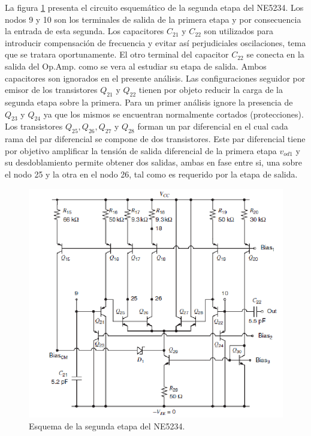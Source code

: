 \documentclass[12pt,a4paper,final,headinclude,footinclude,BCOR5mm]{scrartcl}
\begin{document}
La figura \ref{637} presenta el circuito esquemático de la segunda etapa del NE5234. Los nodos 9 y 10 son los terminales de salida de la primera etapa y por consecuencia la entrada de esta segunda. Los capacitores $C_{21}$ y $C_{22}$ son utilizados para introducir compensación de frecuencia y evitar así perjudiciales oscilaciones, tema que se tratara oportunamente. El otro terminal del capacitor $C_{22}$ se conecta en la salida del Op.Amp. como se vera al estudiar su etapa de salida. Ambos capacitores son ignorados en el presente análisis. Las configuraciones seguidor por emisor de los transistores $Q_{21}$ y $Q_{22}$ tienen por objeto reducir la carga de la segunda etapa sobre la primera. Para un primer análisis ignore la presencia de $Q_{23}$ y $Q_{24}$ ya que los mismos se encuentran normalmente cortados (protecciones). Los transistores $Q_{25},Q_{26},Q_{27}$ y $Q_{28}$ forman un par diferencial en el cual cada rama del par diferencial se compone de dos transistores. Este par diferencial tiene por objetivo amplificar la tensión de salida diferencial de la primera etapa $v_{od1}$ y su desdoblamiento permite obtener dos salidas, ambas en fase entre si, una sobre el nodo 25 y la otra en el nodo 26, tal como es requerido por la etapa de salida.\\

\begin{figure}[!h]
\begin{center}
\includegraphics[width=400pt]{./imagenes/secondne5234.png}
\end{center}
\caption{Esquema de la segunda etapa del NE5234.}
\label{637}
\end{figure}
\end{document}
